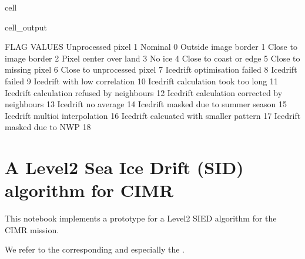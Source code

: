 \documentclass[letterpaper,10pt,english]{jupyterBook}
\begin{document}
\begin{sphinxuseclass}{cell}
\begin{sphinxVerbatimOutput}
\begin{sphinxuseclass}{cell_output}
\noindent{}

\begin{sphinxVerbatim}[commandchars=\\\{\}]
FLAG VALUES 
Unprocessed pixel                              \PYGZhy{}1
Nominal                                        0
Outside image border                           1
Close to image border                          2
Pixel center over land                         3
No ice                                         4
Close to coast or edge                         5
Close to missing pixel                         6
Close to unprocessed pixel                     7
Icedrift optimisation failed                   8
Icedrift failed                                9
Icedrift with low correlation                  10
Icedrift calculation took too long             11
Icedrift calculation refused by neighbours     12
Icedrift calculation corrected by neighbours   13
Icedrift no average                            14
Icedrift masked due to summer season           15
Icedrift multi\PYGZhy{}oi interpolation                16
Icedrift calcuated with smaller pattern        17
Icedrift masked due to NWP                     18
\end{sphinxVerbatim}

\noindent{}

\end{sphinxuseclass}\end{sphinxVerbatimOutput}

\end{sphinxuseclass}
\sphinxstepscope


\chapter{A Level\sphinxhyphen{}2 Sea Ice Drift (SID) algorithm for CIMR}
\label{\detokenize{CIMR_L2_Sea_Ice_Drift_performanceAssessment:a-level-2-sea-ice-drift-sid-algorithm-for-cimr}}\label{\detokenize{CIMR_L2_Sea_Ice_Drift_performanceAssessment::doc}}
\sphinxAtStartPar
This notebook implements a prototype for a Level\sphinxhyphen{}2 SIED algorithm for the CIMR mission.

\sphinxAtStartPar
We refer to the corresponding  and especially the .
\end{document}
